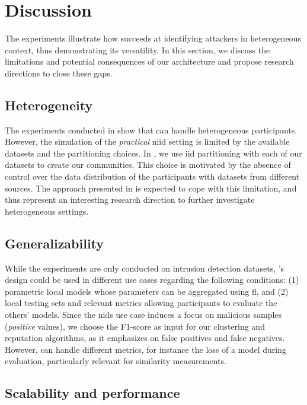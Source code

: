 \section{Discussion\label{sec:radar.discussion}}

The experiments illustrate how \thecontrib succeeds at identifying attackers in heterogeneous context, thus demonstrating its versatility.
In this section, we discuss the limitations and potential consequences of our architecture and propose research directions to close these gaps. 


\subsection{Heterogeneity}

The experiments conducted in  show that \thecontrib can handle heterogeneous participants.
However, the simulation of the \emph{practical} \gls{niid} setting is limited by the available datasets and the partitioning choices.
In \thecontrib, we use \gls{iid} partitioning with each of our datasets to create our communities.
This choice is motivated by the absence of control over the data distribution of the participants with datasets from different sources.
The approach presented in  is expected to cope with this limitation, and thus represent an interesting research direction to further investigate heterogeneous settings.


\subsection{Generalizability}

While the experiments are only conducted on intrusion detection datasets, \thecontrib's design could be used in different use cases regarding the following conditions: (1) parametric local models whose parameters can be aggregated using \gls{fl}, and (2) local testing sets and relevant metrics allowing participants to evaluate the others’ models.
Since the \gls{nids} use case induces a focus on malicious samples (\ie \emph{positive} values), we choose the F1-score as input for our clustering and reputation algorithms, as it emphasizes on false positives and false negatives.
However, \thecontrib can handle different metrics, for instance the loss of a model during evaluation, particularly relevant for similarity measurements.


\subsection{Scalability and performance}


